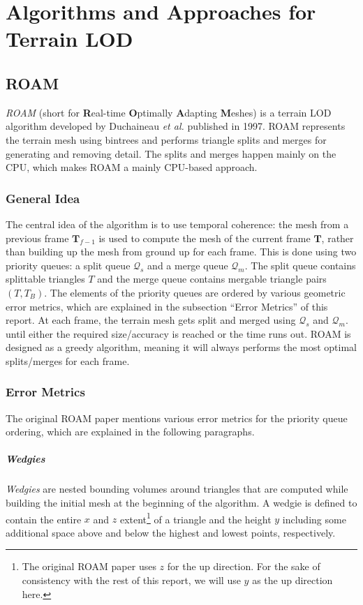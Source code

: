 \chapter{Algorithms and Approaches for Terrain LOD}
\section{ROAM}
\textit{ROAM} (short for \textbf{R}eal-time \textbf{O}ptimally \textbf{A}dapting \textbf{M}eshes) 
is a terrain LOD algorithm developed by Duchaineau \textit{et al.} \cite{roam} published in 1997.
ROAM represents the terrain mesh using bintrees and performs triangle splits and merges
for generating and removing detail. 
The splits and merges happen mainly on the CPU, which makes ROAM a mainly CPU-based approach.

\subsection{General Idea}
The central idea of the algorithm is to use temporal coherence: the mesh from a previous frame $\mathbf{T}_{f-1}$ is used to compute 
the mesh of the current frame $\mathbf{T}$, rather than building up the mesh from ground up for each frame.
This is done using two priority queues: a split queue $\mathcal{Q}_s$ and a merge queue $\mathcal{Q}_m$.
The split queue contains splittable triangles $T$
and the merge queue contains mergable triangle pairs $(T,T_B)$.
The elements of the priority queues are ordered by 
various geometric error metrics, which are explained in the subsection ``Error Metrics'' of this report.
At each frame, the terrain mesh gets split and merged using $\mathcal{Q}_s$ and $\mathcal{Q}_m$. until either the required size/accuracy is reached
or the time runs out.
ROAM is designed as a greedy algorithm, meaning it will always performs the most optimal splits/merges for each frame.

\subsection{Error Metrics}
The original ROAM paper mentions various error metrics for the priority queue ordering,
which are explained in the following paragraphs.

\paragraph{Wedgies} \textit{Wedgies} are nested bounding volumes around triangles that are computed 
while building the initial mesh at the beginning of the algorithm.
A wedgie is defined to contain the entire $x$ and $z$ extent\footnote{The original ROAM paper uses $z$ for the up direction. For the sake of consistency with the rest of this report, we will use $y$ as the up direction here.}
of a triangle and the height $y$ including some additional space above and below the highest and lowest points,
respectively.

